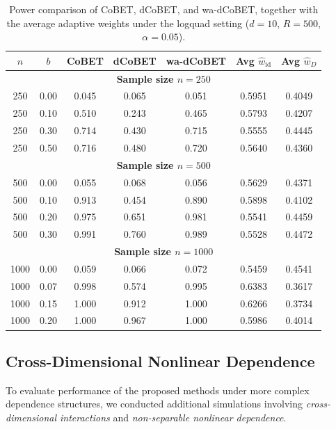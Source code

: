 \documentclass[12pt,reqno,oneside]{amsbook}
\theoremstyle{definition}
\theoremstyle{remark}
\begin{document}
\begin{table}[ht]
\centering
\begin{tabular}{ccccccc}
\hline
$n$ & $b$ & CoBET & dCoBET & wa-dCoBET & Avg $\hat{w}_{\mathrm{id}}$ & Avg $\hat{w}_D$ \\
\hline
\multicolumn{7}{c}{\textbf{Sample size $n=250$}} \\
\hline
250 & 0.00 & 0.045 & 0.065 & 0.051 & 0.5951 & 0.4049 \\
250 & 0.10 & 0.510 & 0.243 & 0.465 & 0.5793 & 0.4207 \\
250 & 0.30 & 0.714 & 0.430 & 0.715 & 0.5555 & 0.4445 \\
250 & 0.50 & 0.716 & 0.480 & 0.720 & 0.5640 & 0.4360 \\
\hline
\multicolumn{7}{c}{\textbf{Sample size $n=500$}} \\
\hline
500 & 0.00 & 0.055 & 0.068 & 0.056 & 0.5629 & 0.4371 \\
500 & 0.10 & 0.913 & 0.454 & 0.890 & 0.5898 & 0.4102 \\
500 & 0.20 & 0.975 & 0.651 & 0.981 & 0.5541 & 0.4459 \\
500 & 0.30 & 0.991 & 0.760 & 0.989 & 0.5528 & 0.4472 \\
\hline
\multicolumn{7}{c}{\textbf{Sample size $n=1000$}} \\
\hline
1000 & 0.00 & 0.059 & 0.066 & 0.072 & 0.5459 & 0.4541 \\
1000 & 0.07 & 0.998 & 0.574 & 0.995 & 0.6383 & 0.3617 \\
1000 & 0.15 & 1.000 & 0.912 & 1.000 & 0.6266 & 0.3734 \\
1000 & 0.20 & 1.000 & 0.967 & 1.000 & 0.5986 & 0.4014 \\
\hline
\end{tabular}
\caption{Power comparison of CoBET, dCoBET, and wa-dCoBET, together with the average adaptive weights under the logquad setting ($d=10$, $R=500$, $\alpha=0.05$).}
\label{tab:logquad_weight_power_compare}
\end{table}

\subsection{Cross-Dimensional Nonlinear Dependence}

To evaluate performance of the proposed methods under more complex dependence structures, we conducted additional simulations involving \emph{cross-dimensional interactions} and \emph{non-separable nonlinear dependence}.
\end{document}
